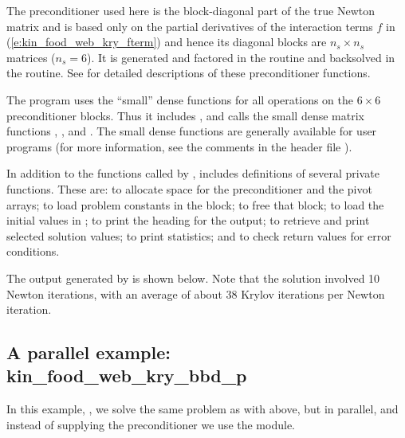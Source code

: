 The preconditioner used here is the block-diagonal part of the true Newton
matrix and is based only on the partial derivatives of the interaction terms $f$
in (\ref{e:kin_food_web_kry_fterm}) and hence its  diagonal blocks are $n_s \times n_s$ matrices
($n_s = 6$).
It is generated and factored in the  routine and
backsolved in the  routine.  
See  for detailed descriptions
of these preconditioner functions.

The program  uses the ``small'' dense functions for all operations 
on the $6 \times 6$ preconditioner blocks.  
Thus it includes , and calls the small dense matrix
functions , , and .
The small dense functions are generally available for {\kinsol} user programs
(for more information, see the comments in the header file ).

In addition to the functions called by {\kinsol},  includes
definitions of several private functions.  These are: 
to allocate space for the preconditioner and the pivot arrays; 
to load problem constants in the  block;  to free
that block;  to load the initial values in ;
 to print the heading for the output;
 to retrieve and print selected solution values;
 to print statistics; and 
to check return values for error conditions.

The output generated by  is shown below.  Note that the
solution involved 10 Newton iterations, with an average of about 38
Krylov iterations per Newton iteration.



\subsection{A parallel example: kin\_food\_web\_kry\_bbd\_p}\label{ss:kin_food_web_kry_bbd_p}

In this example, , we solve the same
problem as with  above, but in parallel, and
instead of supplying the preconditioner we use the {\kinbbdpre} module.  

